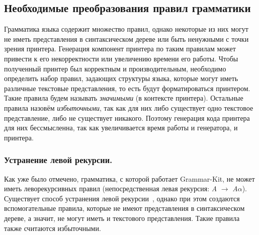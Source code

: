 \subsection{Необходимые преобразования правил грамматики}%
Грамматика языка содержит множество правил, однако некоторые из них могут не иметь представления в синтаксическом дереве или быть ненужными с точки зрения принтера.
Генерация компонент принтера по таким правилам может привести к его некорректности или увеличению времени его работы.
Чтобы полученный принтер был корректным и производительным, необходимо определить набор правил, задающих структуры языка, которые могут иметь различные текстовые представления, то есть будут форматироваться принтером.
Такие правила будем называть \emph{значимыми} (в контексте принтера).
Остальные правила назовём \emph{избыточными}, так как для них либо существует одно текстовое представление, либо не существует никакого.
Поэтому генерация кода принтера для них бессмысленна, так как увеличивается время работы и генератора, и принтера.


\subsubsection{Устранение левой рекурсии.}
Как уже было отмечено, грамматика, с которой работает Grammar-Kit, не может иметь леворекурсивных правил (непосредственная левая рекурсия: \emph{A} $\rightarrow$ \emph{A}$\alpha$).
Существует способ устранения левой рекурсии~\cite{book:ulman}, однако при этом создаются вспомогательные правила, которые не имеют представления в синтаксическом дереве, а значит, не могут иметь и текстового представления.
Такие правила также считаются избыточными.

